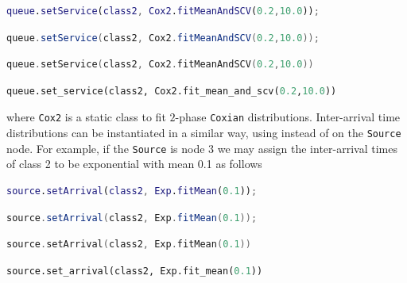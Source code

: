 \begin{MATLAB}
\begin{lstlisting}[language = matlab]
queue.setService(class2, Cox2.fitMeanAndSCV(0.2,10.0));
\end{lstlisting}
\end{MATLAB}
\begin{JAVA}
\begin{lstlisting}[language = java, basicstyle=\ttfamily\scriptsize]
queue.setService(class2, Cox2.fitMeanAndSCV(0.2,10.0));
\end{lstlisting}
\end{JAVA}
\begin{KOTLIN}
\begin{lstlisting}[language = kotlin, basicstyle=\ttfamily\scriptsize]
queue.setService(class2, Cox2.fitMeanAndSCV(0.2,10.0))
\end{lstlisting}
\end{KOTLIN}
\begin{PYTHON}
\begin{lstlisting}[language = python]
queue.set_service(class2, Cox2.fit_mean_and_scv(0.2,10.0))
\end{lstlisting}
\end{PYTHON}
where \texttt{Cox2} is a static class to fit $2$-phase \texttt{Coxian} distributions. Inter-arrival time distributions can be instantiated in a similar way, using  instead of  on the \texttt{Source} node. For example, if the \texttt{Source} is node 3 we may assign the inter-arrival times of class 2 to be exponential with mean 0.1 as follows
\begin{MATLAB}
\begin{lstlisting}[language = matlab]
source.setArrival(class2, Exp.fitMean(0.1));
\end{lstlisting}
\end{MATLAB}
\begin{JAVA}
\begin{lstlisting}[language = java, basicstyle=\ttfamily\scriptsize]
source.setArrival(class2, Exp.fitMean(0.1));
\end{lstlisting}
\end{JAVA}
\begin{KOTLIN}
\begin{lstlisting}[language = kotlin, basicstyle=\ttfamily\scriptsize]
source.setArrival(class2, Exp.fitMean(0.1))
\end{lstlisting}
\end{KOTLIN}
\begin{PYTHON}
\begin{lstlisting}[language = python]
source.set_arrival(class2, Exp.fit_mean(0.1))
\end{lstlisting}
\end{PYTHON}

